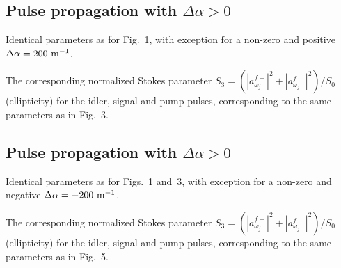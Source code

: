 \subsection{Pulse propagation with $\Delta\alpha>0$}
\centerline{\epsfxsize=246pt}
\noindent
{ Identical parameters as for Fig.~1, with exception
  for a non-zero and positive $\Delta\alpha=200\ {\rm m}^{-1}$.}
\bigskip
\centerline{\epsfxsize=246pt}
\noindent
{ The corresponding normalized Stokes parameter
  $S_3=(|a^{f+}_{\omega_j}|^2+|a^{f-}_{\omega_j}|^2)/S_0$ (ellipticity) for the
  idler, signal and pump pulses, corresponding to the same parameters as
  in Fig.~3.}
\vfill\eject

\subsection{Pulse propagation with $\Delta\alpha>0$}
\centerline{\epsfxsize=246pt}
\noindent
{ Identical parameters as for Figs.~1 and~3, with
  exception for a non-zero and negative $\Delta\alpha=-200\ {\rm m}^{-1}$.}
\bigskip
\centerline{\epsfxsize=246pt}
\noindent
{ The corresponding normalized Stokes parameter
  $S_3=(|a^{f+}_{\omega_j}|^2+|a^{f-}_{\omega_j}|^2)/S_0$ (ellipticity) for the
  idler, signal and pump pulses, corresponding to the same parameters as
  in Fig.~5.}
\vfill\eject

\bye
